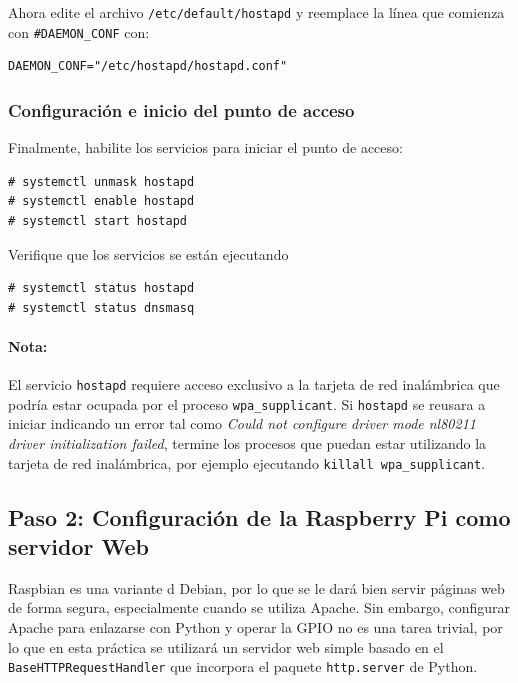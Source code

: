 \documentclass[letterpaper,10.5pt]{article}
\begin{document}
Ahora edite el archivo \texttt{/etc/default/hostapd} y reemplace la línea que comienza con \texttt{\#DAEMON\_CONF} con:

\begin{Verbatim}
DAEMON_CONF="/etc/hostapd/hostapd.conf"
\end{Verbatim}

\subsubsection{Configuración e inicio del punto de acceso}%
\label{sec:ap-hotspot}
Finalmente, habilite los servicios para iniciar el punto de acceso:

\begin{Verbatim}
# systemctl unmask hostapd
# systemctl enable hostapd
# systemctl start hostapd
\end{Verbatim}

Verifique que los servicios se están ejecutando

\begin{Verbatim}
# systemctl status hostapd
# systemctl status dnsmasq
\end{Verbatim}

\paragraph*{Nota:} El servicio \texttt{hostapd} requiere acceso exclusivo a la tarjeta de red inalámbrica que podría estar ocupada por el proceso \texttt{wpa\_supplicant}.
Si \texttt{hostapd} se reusara a iniciar indicando un error tal como \emph{Could not configure driver mode nl80211 driver initialization failed}, termine los procesos que puedan estar utilizando la tarjeta de red inalámbrica, por ejemplo ejecutando \texttt{killall wpa\_supplicant}.

%
%
\subsection{Paso 2: Configuración de la Raspberry Pi como servidor Web}%
\label{sec:webserver}

Raspbian es una variante d Debian, por lo que se le dará bien servir páginas web de forma segura, especialmente cuando se utiliza Apache.
Sin embargo, configurar Apache para enlazarse con Python y operar la GPIO no es una tarea trivial, por lo que en esta práctica se utilizará un servidor web simple basado en el \texttt{BaseHTTPRequestHandler} que incorpora el paquete \texttt{http.server} de Python.
\end{document}
